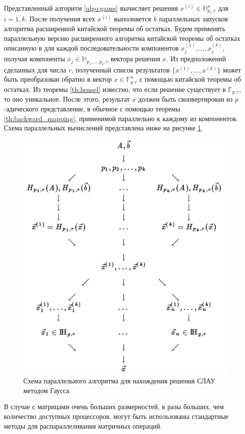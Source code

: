 \documentclass[master, och, diploma, times]{sty/SCWorks}
\theoremstyle{plain}
\theoremstyle{definition}
\numberwithin{equation}{section}
\begin{document}
Представленный алгоритм \ref{algo:gauss} вычисляет решения $x^{(i)} \in \mathbb{H}_{p_i,r}^n$ для $i = \overline{1,k}$. После получения всех $x^{(i)}$ выполняется $k$ параллельных запусков алгоритма расширенной китайской теоремы об остатках. Будем применять параллельную версию расширенного алгоритма китайской теоремы об остатках описанную в \cite{bib:numbers:limongelli} для каждой последовательности компонентов $x_j^{(1)}, \dots, x_j^{(k)}$, получая компоненты $x_j \in \mathbb{H}_{p_1,\dots,p_k,r}$ вектора решения $x$.
Из предположений сделанных для числа $r$, полученный список результатов $\{x^{(1)},\dots,x^{(k)}\}$ может быть преобразован обратно в вектор $x \in \mathbb{F}_{g,r}^n$ с помощью китайской теоремы об остатках. Из теоремы \ref{th:hensel} известно, что если решение существует в $\mathbb{F}_{g,r}$, то оно уникальное.
После этого, результат $x$ должен быть сконвертирован из $p$-адического представление, в обычное с помощью теоремы \ref{th:backward_mapping}, применимой параллельно к каждому из компонентов. Схема параллельных вычислений представлена ниже на рисунке \ref{img:multi:gauss}.

\begin{figure}[H]
\centerline{\includegraphics[width=0.7\linewidth]{images/multi/native.png}}
\caption{Схема параллельного алгоритма для нахождения решения СЛАУ методом Гаусса.}
\label{img:multi:gauss}
\end{figure}


В случае с матрицами очень больших размерностей, в разы больших, чем количество доступных процессоров, могут быть использованы стандартные методы для распараллеливания матричных операций.
\end{document}
